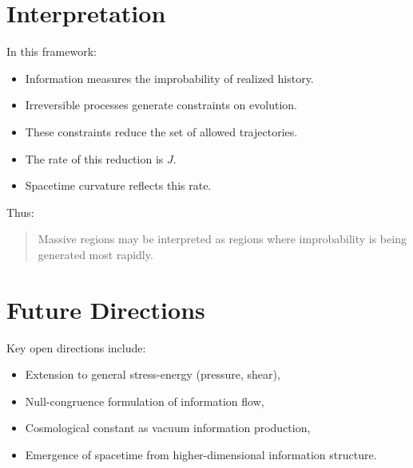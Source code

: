 \documentclass[12pt]{article}
\begin{document}
\section{Interpretation}

In this framework:

\begin{itemize}
\item Information measures the improbability of realized history.
\item Irreversible processes generate constraints on evolution.
\item These constraints reduce the set of allowed trajectories.
\item The rate of this reduction is $J$.
\item Spacetime curvature reflects this rate.
\end{itemize}

Thus:

\begin{quote}
Massive regions may be interpreted as regions where
improbability is being generated most rapidly.
\end{quote}

\section{Future Directions}

Key open directions include:

\begin{itemize}
\item Extension to general stress-energy (pressure, shear),
\item Null-congruence formulation of information flow,
\item Cosmological constant as vacuum information production,
\item Emergence of spacetime from higher-dimensional information structure.
\end{itemize}
\end{document}

